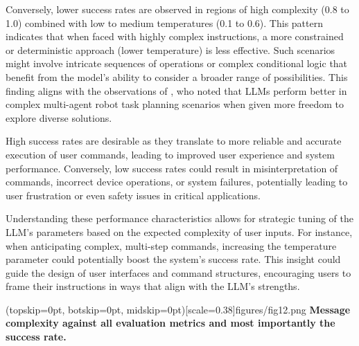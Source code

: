 \documentclass{ieeeaccess}
\begin{document}
Conversely, lower success rates are observed in regions of high complexity (0.8 to 1.0) combined with low to medium temperatures (0.1 to 0.6). This pattern indicates that when faced with highly complex instructions, a more constrained or deterministic approach (lower temperature) is less effective. Such scenarios might involve intricate sequences of operations or complex conditional logic that benefit from the model's ability to consider a broader range of possibilities. This finding aligns with the observations of \citet{kannan2024smartllmsmartmultiagentrobot}, who noted that LLMs perform better in complex multi-agent robot task planning scenarios when given more freedom to explore diverse solutions. 

High success rates are desirable as they translate to more reliable and accurate execution of user commands, leading to improved user experience and system performance. Conversely, low success rates could result in misinterpretation of commands, incorrect device operations, or system failures, potentially leading to user frustration or even safety issues in critical applications. 

Understanding these performance characteristics allows for strategic tuning of the LLM's parameters based on the expected complexity of user inputs. For instance, when anticipating complex, multi-step commands, increasing the temperature parameter could potentially boost the system's success rate. This insight could guide the design of user interfaces and command structures, encouraging users to frame their instructions in ways that align with the LLM's strengths.

\Figure[t!](topskip=0pt, botskip=0pt,
midskip=0pt)[scale=0.38]{{figures/fig12.png}}
{ \textbf{Message complexity against all evaluation metrics and most importantly the success rate.}\label{fig12}}
\end{document}
